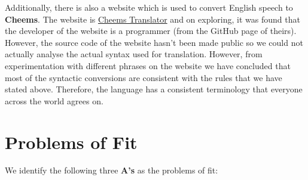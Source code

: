 \def\DevnagVersion{2.17}\documentclass{article}
\begin{document}
Additionally, there is also a website which is used to convert English speech to \textbf{Cheems}. The website is \href{https://cheems.mirazmac.com/}{Cheems Translator} and on exploring, it was found that the developer of the website is a programmer (from the GitHub page of theirs). However, the source code of the website hasn't been made public so we could not actually analyse the actual syntax used for translation. However, from experimentation with different phrases on the website we have concluded that most of the syntactic conversions are consistent with the rules that we have stated above. Therefore, the language has a consistent terminology that everyone across the world agrees on.

\section{Problems of Fit}

We identify the following three \textbf{A's} as the problems of fit:
\end{document}
